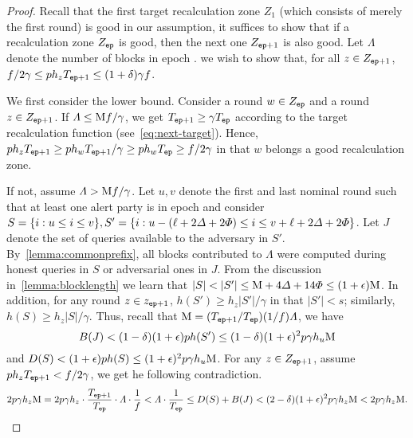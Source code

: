 \lemmagoodchains

\begin{proof}
    Recall that the first target recalculation zone $Z_1$ (which consists of merely the first round) is good in our assumption, it suffices to show that if a recalculation zone $Z_\mathtt{ep}$ is good, then the next one $Z_{\mathtt{ep} + 1}$ is also good.
    Let $\varLambda$ denote the number of blocks in epoch \epoch.
    we wish to show that, for all $z \in Z_{\mathtt{ep} + 1}$, $f / 2\gamma \le p h_z T_{\mathtt{ep} + 1} \le (1 + \delta) \gamma f$.

    We first consider the lower bound.
    Consider a round $w \in Z_\mathtt{ep}$ and a round $z \in Z_{\mathtt{ep} + 1}$.
    If $\varLambda \le \mathrm{M} f / \gamma$, we get $T_{\mathtt{ep} + 1} \ge \gamma T_\mathtt{ep}$ according to the target recalculation function (see~\cref{eq:next-target}).
    Hence, $p h_z T_{\mathtt{ep} + 1} \ge p h_w T_{\mathtt{ep} + 1} / \gamma \ge p h_w T_\mathtt{ep} \ge f / 2\gamma$ in that $w$ belongs a good recalculation zone.

    If not, assume $\varLambda > \mathrm{M} f / \gamma$.
    Let $u, v$ denote the first and last nominal round such that at least one alert party is in epoch \epoch and consider $S = \{i : u \le i \le v\}, S' = \{i : u - (\ell + 2\varDelta + 2\varPhi) \le i \le v + \ell + 2\varDelta + 2\varPhi \}$.
    Let $J$ denote the set of queries available to the adversary in $S'$.
    By~\cref{lemma:commonprefix}, all blocks contributed to $\varLambda$ were computed during honest queries in $S$ or adversarial ones in $J$.
    From the discussion in~\cref{lemma:blocklength} we learn that $|S| < |S'| \le \mathrm{M} + 4\varDelta + 14\varPhi \le (1 + \epsilon) \mathrm{M}$.
    In addition, for any round $z \in z_{\mathtt{ep} + 1}$, $h(S') \ge h_z |S'| / \gamma$ in that $|S'| < s$; similarly, $h(S) \ge h_z |S| / \gamma$.
    Thus, recall that $\mathrm{M} = (T_{\mathtt{ep} + 1} / T_\mathtt{ep}) (1 / f) \varLambda$, we have
    \[ B(J) < (1 - \delta)(1 + \epsilon) p h(S') \le (1 - \delta)(1 + \epsilon)^2 p \gamma h_u \mathrm{M} \]
    and $D(S) < (1 + \epsilon) p h(S) \le (1 + \epsilon)^2 p \gamma h_u \mathrm{M}$.
    For any $z \in Z_{\mathtt{ep} + 1}$, assume $p h_z T_{\mathtt{ep} + 1} < f / 2\gamma$, we get he following contradiction.
    \[ 2 p \gamma h_z \mathrm{M} = 2 p \gamma h_z \cdot \frac{T_{\mathtt{ep} + 1}}{T_\mathtt{ep}} \cdot \varLambda \cdot \frac{1}{f} < \varLambda \cdot \frac{1}{T_\mathtt{ep}} \le D(S) + B(J) < (2 - \delta) (1 + \epsilon)^2 p \gamma h_z \mathrm{M} < 2p \gamma h_z \mathrm{M}. \]


\end{proof}
